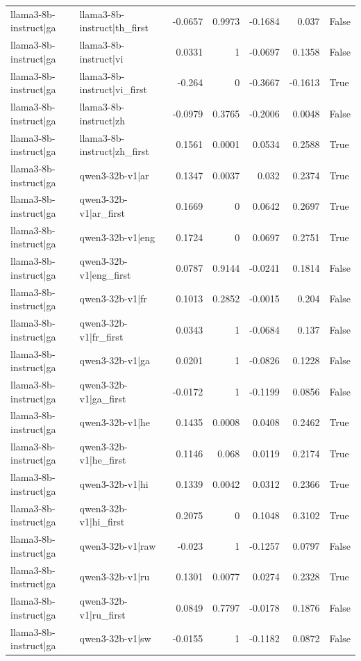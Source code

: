 \begin{table}
\begin{tabular}{l l r r r r l}
llama3-8b-instruct|ga & llama3-8b-instruct|th_first & -0.0657 & 0.9973 & -0.1684 & 0.037 & False \\
llama3-8b-instruct|ga & llama3-8b-instruct|vi & 0.0331 & 1 & -0.0697 & 0.1358 & False \\
llama3-8b-instruct|ga & llama3-8b-instruct|vi_first & -0.264 & 0 & -0.3667 & -0.1613 & True \\
llama3-8b-instruct|ga & llama3-8b-instruct|zh & -0.0979 & 0.3765 & -0.2006 & 0.0048 & False \\
llama3-8b-instruct|ga & llama3-8b-instruct|zh_first & 0.1561 & 0.0001 & 0.0534 & 0.2588 & True \\
llama3-8b-instruct|ga & qwen3-32b-v1|ar & 0.1347 & 0.0037 & 0.032 & 0.2374 & True \\
llama3-8b-instruct|ga & qwen3-32b-v1|ar_first & 0.1669 & 0 & 0.0642 & 0.2697 & True \\
llama3-8b-instruct|ga & qwen3-32b-v1|eng & 0.1724 & 0 & 0.0697 & 0.2751 & True \\
llama3-8b-instruct|ga & qwen3-32b-v1|eng_first & 0.0787 & 0.9144 & -0.0241 & 0.1814 & False \\
llama3-8b-instruct|ga & qwen3-32b-v1|fr & 0.1013 & 0.2852 & -0.0015 & 0.204 & False \\
llama3-8b-instruct|ga & qwen3-32b-v1|fr_first & 0.0343 & 1 & -0.0684 & 0.137 & False \\
llama3-8b-instruct|ga & qwen3-32b-v1|ga & 0.0201 & 1 & -0.0826 & 0.1228 & False \\
llama3-8b-instruct|ga & qwen3-32b-v1|ga_first & -0.0172 & 1 & -0.1199 & 0.0856 & False \\
llama3-8b-instruct|ga & qwen3-32b-v1|he & 0.1435 & 0.0008 & 0.0408 & 0.2462 & True \\
llama3-8b-instruct|ga & qwen3-32b-v1|he_first & 0.1146 & 0.068 & 0.0119 & 0.2174 & True \\
llama3-8b-instruct|ga & qwen3-32b-v1|hi & 0.1339 & 0.0042 & 0.0312 & 0.2366 & True \\
llama3-8b-instruct|ga & qwen3-32b-v1|hi_first & 0.2075 & 0 & 0.1048 & 0.3102 & True \\
llama3-8b-instruct|ga & qwen3-32b-v1|raw & -0.023 & 1 & -0.1257 & 0.0797 & False \\
llama3-8b-instruct|ga & qwen3-32b-v1|ru & 0.1301 & 0.0077 & 0.0274 & 0.2328 & True \\
llama3-8b-instruct|ga & qwen3-32b-v1|ru_first & 0.0849 & 0.7797 & -0.0178 & 0.1876 & False \\
llama3-8b-instruct|ga & qwen3-32b-v1|sw & -0.0155 & 1 & -0.1182 & 0.0872 & False \\

\end{tabular}
\end{table}
